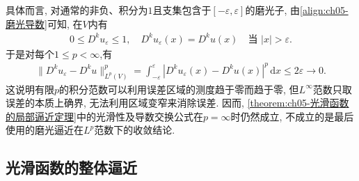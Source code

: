 \documentclass[../../main.tex]{subfiles}
\begin{document}
\begin{remark}
具体而言, 对通常的非负、积分为$1$且支集包含于$[-\varepsilon,\varepsilon]$的磨光子, 由\eqref{align:ch05-磨光导数}可知, 在$V$内有
\begin{align*}
0\leqslant D^ku_\varepsilon\leqslant1,\quad
D^ku_\varepsilon(x)=D^ku(x)\quad\text{当 }|x|>\varepsilon.
\end{align*}
于是对每个$1\leqslant p<\infty$,有
\begin{align*}
\|D^ku_\varepsilon-D^ku\|_{L^p(V)}^p
=\int_{-\varepsilon}^{\varepsilon}
|D^ku_\varepsilon(x)-D^ku(x)|^p\,\mathrm{d}x
\leqslant2\varepsilon\to0.
\end{align*}
这说明有限$p$的积分范数可以利用误差区域的测度趋于零而趋于零, 但$L^\infty$范数只取误差的本质上确界, 无法利用区域变窄来消除误差. 因而, \cref{theorem:ch05-光滑函数的局部逼近定理}中的光滑性及导数交换公式在$p=\infty$时仍然成立, 不成立的是最后使用的磨光逼近在$L^p$范数下的收敛结论.
\end{remark}

\subsection{光滑函数的整体逼近}\label{subsection:ch05-光滑函数逼近}
\end{document}
